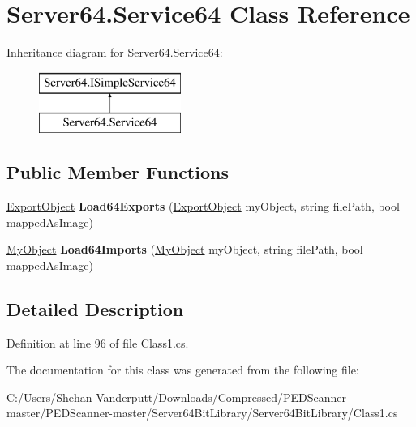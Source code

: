 \hypertarget{class_server64_1_1_service64}{}\section{Server64.\+Service64 Class Reference}
\label{class_server64_1_1_service64}
Inheritance diagram for Server64.\+Service64\+:\begin{figure}[H]
\begin{center}
\leavevmode
\includegraphics[height=2.000000cm]{class_server64_1_1_service64}
\end{center}
\end{figure}
\subsection*{Public Member Functions}
\begin{DoxyCompactItemize}
\item 
\mbox{\label{class_server64_1_1_service64_a810e3a5b7c788a01feb3ac83f1a47a35}} 
\mbox{\hyperlink{class_objects_1_1_export_object}{Export\+Object}} {\bfseries Load64\+Exports} (\mbox{\hyperlink{class_objects_1_1_export_object}{Export\+Object}} my\+Object, string file\+Path, bool mapped\+As\+Image)
\item 
\mbox{\label{class_server64_1_1_service64_ae73f54f0755da6925ff5382c3f5d2bc2}} 
\mbox{\hyperlink{class_objects_1_1_my_object}{My\+Object}} {\bfseries Load64\+Imports} (\mbox{\hyperlink{class_objects_1_1_my_object}{My\+Object}} my\+Object, string file\+Path, bool mapped\+As\+Image)
\end{DoxyCompactItemize}


\subsection{Detailed Description}


Definition at line 96 of file Class1.\+cs.



The documentation for this class was generated from the following file\+:\begin{DoxyCompactItemize}
\item 
C\+:/\+Users/\+Shehan Vanderputt/\+Downloads/\+Compressed/\+P\+E\+D\+Scanner-\/master/\+P\+E\+D\+Scanner-\/master/\+Server64\+Bit\+Library/\+Server64\+Bit\+Library/Class1.\+cs\end{DoxyCompactItemize}
